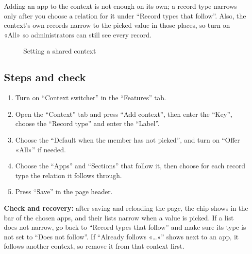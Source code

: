 \begin{rcwarn}
Adding an app to the context is not enough on its own; a record type narrows only after you choose a relation for it under “Record types that follow”. Also, the context's own records narrow to the picked value in those places, so turn on «All» so administrators can still see every record.
\end{rcwarn}

\begin{figure}[H]
\centering
{}
\rclegend
\caption{Setting a shared context}
\label{fig:builder-work-navigation-context-flow}
\end{figure}

\subsection{Steps and check}
\begin{enumerate}
\item Turn on “Context switcher” in the “Features” tab.
\item Open the “Context” tab and press “Add context”, then enter the “Key”, choose the “Record type” and enter the “Label”.
\item Choose the “Default when the member has not picked”, and turn on “Offer «All»” if needed.
\item Choose the “Apps” and “Sections” that follow it, then choose for each record type the relation it follows through.
\item Press “Save” in the page header.
\end{enumerate}

\textbf{Check and recovery:} after saving and reloading the page, the chip shows in the bar of the chosen apps, and their lists narrow when a value is picked. If a list does not narrow, go back to “Record types that follow” and make sure its type is not set to “Does not follow”. If “Already follows «…»” shows next to an app, it follows another context, so remove it from that context first.

